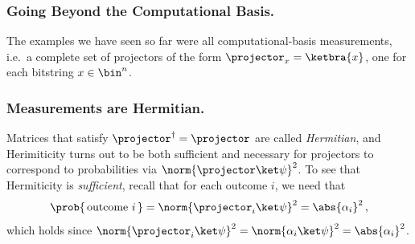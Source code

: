   \subsubsection{Going Beyond the Computational Basis.}
    The examples we have seen so far were all computational-basis
      measurements, i.e.\ a complete set of projectors of the form 
      $\projector_x = \ketbra{x}$, one for each bitstring $x \in \bin^n$.

    \subsubsection{Measurements are Hermitian.}
      Matrices that satisfy $\projector^\dagger = \projector$ are called
        \emph{Hermitian}, and Herimiticity turns out to be both sufficient and
        necessary for projectors to correspond to probabilities via
        $\norm{\projector \ket\psi}^2$.
        To see that Hermiticity is \emph{sufficient}, recall that for each
        outcome $i$, we need that
        \[
          \prob{\, \text{outcome } i\, } 
          = \norm{\projector_i \ket \psi}^2 = \abs{\alpha_i}^2\, ,
        \]
        which holds since $\norm{\projector_i \ket \psi}^2 
        = \norm{\alpha_i \ket \psi}^2
        = \abs{\alpha_i}^2$. 
